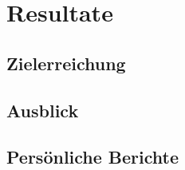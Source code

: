 \chapter{Resultate}
\label{tb-resultate}

\section{Zielerreichung}


\section{Ausblick}


\section{Persönliche Berichte}

